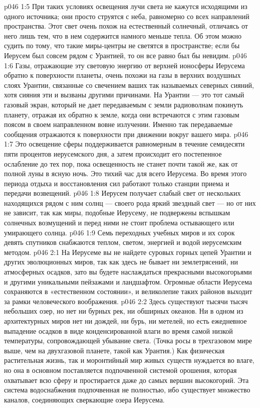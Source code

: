 \vs p046 1:5 При таких условиях освещения лучи света не кажутся исходящими из одного источника; они просто струятся с неба, равномерно со всех направлений пространства. Этот свет очень похож на естественный солнечный, отличаясь от него лишь тем, что в нем содержится намного меньше тепла. Об этом можно судить по тому, что такие миры\hyp{}центры не светятся в пространстве; если бы Иерусем был совсем рядом с Урантией, то он все равно был бы невидим.
\vs p046 1:6 Газы, отражающие эту световую энергию от верхней ионосферы Иерусема обратно к поверхности планеты, очень похожи на газы в верхних воздушных слоях Урантии, связанные со свечением ваших так называемых северных сияний, хотя сияния эти и вызваны другими причинами. На Урантии --- это тот самый газовый экран, который не дает передаваемым с земли радиоволнам покинуть планету, отражая их обратно к земле, когда они встречаются с этим газовым поясом в своем направленном вовне излучении. Именно так передаваемые сообщения отражаются к поверхности при движении вокруг вашего мира.
\vs p046 1:7 Это освещение сферы поддерживается равномерным в течение семидесяти пяти процентов иерусемского дня, а затем происходит его постепенное ослабление до тех пор, пока освещенность не станет почти такой же, как от полной луны в ясную ночь. Это тихий час для всего Иерусема. Во время этого периода отдыха и восстановления сил работают только станции приема и передачи возвещений.
\vs p046 1:8 \pc Иерусем получает слабый свет от нескольких находящихся рядом с ним солнц --- своего рода яркий звездный свет --- но от них не зависит, так как миры, подобные Иерусему, не подвержены вспышкам солнечных возмущений и перед ними не стоит проблема остывающего или умирающего солнца.
\vs p046 1:9 Семь переходных учебных миров и их сорок девять спутников снабжаются теплом, светом, энергией и водой иерусемским методом.
\vs p046 2:1 На Иерусеме вы не найдете суровых горных цепей Урантии и других эволюционных миров, так как здесь не бывает ни землетрясений, ни атмосферных осадков, зато вы будете наслаждаться прекрасными высокогорьями и другими уникальными пейзажами и ландшафтом. Огромные области Иерусема сохраняются в «естественном состоянии», и великолепие таких районов выходит за рамки человеческого воображения.
\vs p046 2:2 Здесь существуют тысячи тысяч небольших озер, но нет ни бурных рек, ни обширных океанов. Ни в одном из архитектурных миров нет ни дождей, ни бурь, ни метелей, но есть ежедневное выпадение осадков в виде конденсированной влаги во время самой низкой температуры, сопровождающей убывание света. (Точка росы в трехгазовом мире выше, чем на двухгазовой планете, такой как Урантия.) Как физическая растительная жизнь, так и моронтийный мир живых существ нуждается во влаге, но она в основном поставляется подпочвенной системой орошения, которая охватывает всю сферу и простирается даже до самых вершин высокогорий. Эта система водоснабжения подпочвенная не полностью, ибо существует множество каналов, соединяющих сверкающие озера Иерусема.
